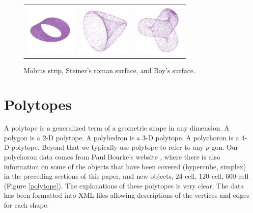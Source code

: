 \begin{figure}[ht]
\centering
\begin{tabular}{ccc}
\includegraphics[width=1in]{fig/mobius.pdf}&\includegraphics[width=1in]{fig/roman.pdf}&\includegraphics[width=1in]{fig/boy-surface.pdf}
\end{tabular}
\caption{Mobius strip, Steiner's roman surface, and Boy's surface.}
\label{klein}
\end{figure}

\section{Polytopes}

A polytope is a generalized term of a geometric shape in any
dimension. A polygon is a 2-D polytope. A polyhedron is a 3-D
polytope. A polychoron is a 4-D polytope. Beyond that we typically use
polytope to refer to any $p$-gon.  Our polychoron data comes from Paul
Bourke's website \citep{PBPlatonic}, where there is also information on some of the 
objects that have been covered (hypercube, simplex) in the preceding sections of this paper, and new
objects, 24-cell, 120-cell, 600-cell (Figure \ref{polytope}).  The explanations of these
polytopes is very clear. The data has been formatted into XML files
allowing descriptions of the vertices and edges for each shape.

